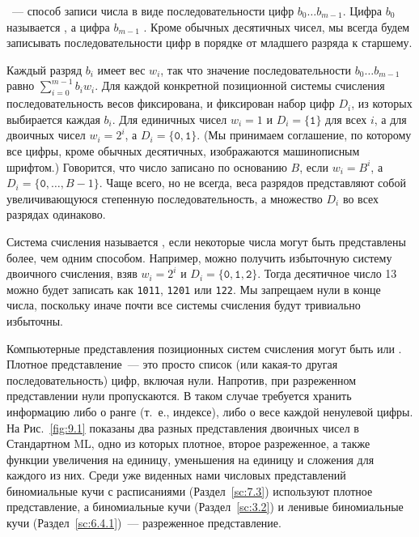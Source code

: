 \cite{Knuth1973b}~--- способ записи числа в виде последовательности
цифр $b_0\ldots b_{m-1}$. Цифра $b_0$ называется , а цифра $b_{m-1}$ . Кроме обычных десятичных чисел, мы всегда будем
записывать последовательности цифр в порядке от младшего разряда к старшему.

Каждый разряд $b_i$ имеет вес $w_i$, так что значение
последовательности $b_0\ldots b_{m-1}$ равно $\sum_{i=0}^{m-1}
b_iw_i$. Для каждой конкретной позиционной системы счисления
последовательность весов фиксирована, и фиксирован набор цифр $D_i$,
из которых выбирается каждая $b_i$. Для единичных чисел $w_i = 1$ и
$D_i = \{\mathtt{1}\}$ для всех $i$, а для двоичных чисел $w_i = 2^i$,
а $D_i = \{\mathtt{0}, \mathtt{1}\}$. (Мы принимаем соглашение, по
которому все цифры, кроме обычных десятичных, изображаются
машинописным шрифтом.)
Говорится, что число записано по основанию $B$, если $w_i =
B^i$, а $D_i = \{\mathtt{0}, \ldots, B-1\}$. Чаще всего, но не всегда,
веса разрядов представляют собой увеличивающуюся степенную
последовательность, а множество $D_i$ во всех разрядах одинаково.

Система счисления называется , если
некоторые числа могут быть представлены более, чем одним способом.
Например, можно получить избыточную систему двоичного счисления, взяв
$w_i = 2^i$ и $D_i = \{\mathtt{0}, \mathtt{1}, \mathtt{2}\}$. Тогда
десятичное число 13 можно будет записать как \texttt{1011},
\texttt{1201} или \texttt{122}. Мы запрещаем нули в конце числа,
поскольку иначе почти все системы счисления будут тривиально
избыточны.

Компьютерные представления позиционных систем счисления могут быть
 или . Плотное
представление~--- это просто список (или какая-то другая
последовательность) цифр, включая нули. Напротив, при разреженном
представлении нули пропускаются. В таком случае требуется хранить
информацию либо о ранге (т.~е., индексе), либо о весе каждой ненулевой
цифры.  На Рис.~\ref{fig:9.1} показаны два разных представления
двоичных чисел в Стандартном ML, одно из которых плотное, второе
разреженное, а также функции увеличения на единицу, уменьшения на
единицу и сложения для каждого из них. Среди уже виденных нами
числовых представлений биномиальные кучи с расписаниями
(Раздел~\ref{sc:7.3}) используют плотное представление, а биномиальные
кучи (Раздел~\ref{sc:3.2}) и ленивые биномиальные кучи
(Раздел~\ref{sc:6.4.1})~--- разреженное представление.

